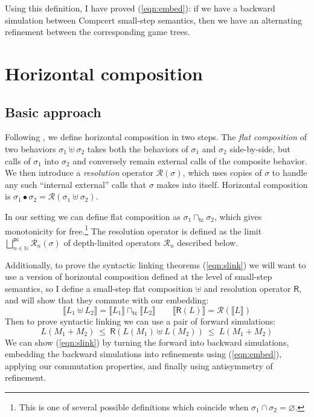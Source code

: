 \documentclass[11pt]{article}
\newcommand{\kw}[1]{{\mathsf{#1}}}
\begin{document}
Using this definition,
I have proved (\ref{eqn:embed}): if we have a backward simulation between
Compcert small-step semantics,
then we have an alternating refinement between
the corresponding game trees.

\section{Horizontal composition}

\subsection{Basic approach}

Following \cite{cpp15},
we define horizontal composition in two steps.
The \emph{flat composition} of two behaviors $\sigma_1 \uplus \sigma_2$
takes both the behaviors of $\sigma_1$ and $\sigma_2$ side-by-side,
but calls of $\sigma_1$ into $\sigma_2$ and conversely remain
external calls of the composite behavior.
We then introduce a \emph{resolution} operator $\mathcal{R}(\sigma)$,
which uses copies of $\sigma$ to handle any such ``internal external'' calls
that $\sigma$ makes into itself.
Horizontal composition is
$\sigma_1 \bullet \sigma_2 = \mathcal{R}(\sigma_1 \uplus \sigma_2)$.

In our setting
we can define flat composition as
$\sigma_1 \sqcap_\kw{tc} \sigma_2$,
which gives monotonicity for free.\footnote{%
This is one of several possible definitions which coincide when
$\sigma_1 \cap \sigma_2 = \varnothing$.}
The resolution operator is defined as the limit
$\bigsqcup^\kw{pc}_{n \in \mathbb{N}} \mathcal{R}_n(\sigma)$
of depth-limited operators $\mathcal{R}_n$ described below.

Additionally,
to prove the syntactic linking theorems (\ref{eqn:slink})
we will want to use a version of horizontal composition
defined at the level of small-step semantics,
so I define a small-step flat composition $\uplus$
and resolution operator $\kw{R}$,
and will show that they commute with our embedding:
\[
  \llbracket L_1 \uplus L_2 \rrbracket =
    \llbracket L_1 \rrbracket \sqcap_\kw{tc}
    \llbracket L_2 \rrbracket
  \qquad
  \llbracket \kw{R}(L) \rrbracket =
    \mathcal{R}(\llbracket L \rrbracket)
\]
Then to prove syntactic linking we can use a pair of forward simulations:
\[
  L(M_1 + M_2) \ \le\  \kw{R}(L(M_1) \uplus L(M_2)) \ \le\  L(M_1 + M_2)
\]
We can show (\ref{eqn:slink}) by
turning the forward into backward simulations,
embedding the backward simulations into refinements using (\ref{eqn:embed}),
applying our commutation properties, and
finally using antisymmetry of refinement.
\end{document}
